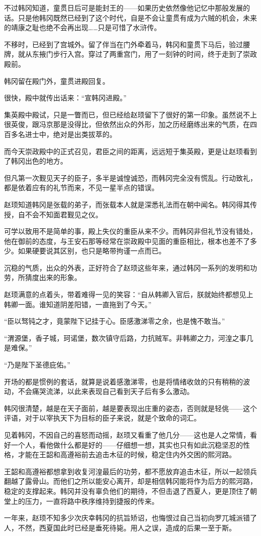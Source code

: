 不过韩冈知道，童贯日后可是能封王的——如果历史依然像他记忆中那般发展的话。只是他韩冈既然已经到了这个时代，自是不会让童贯有成为六贼的机会，未来的靖康之耻也绝不会再出现……只是可惜了水浒传。

不移时，已经到了宫城外。留了伴当在门外牵着马，韩冈和童贯下马后，验过腰牌，就从东掖门步行入宫。穿过了两重宫门，用了一刻钟的时间，终于走到了崇政殿前。

韩冈留在殿门外，童贯进殿回复。

很快，殿中就传出话来：“宣韩冈进殿。”

集英殿中殿试，只是一瞥而已，但已经给赵顼留下了很好的第一印象。虽然说不上很英俊，跟冯京那是没得比，但依然出众的外形，加之历经磨练出来的气质，在四百多名进士中，绝对是出类拔萃的。

而今天崇政殿中的正式召见，君臣之间的距离，远远短于集英殿，更是让赵顼看到了韩冈出色的地方。

但凡第一次觐见天子的臣子，多半是诚惶诚恐，而韩冈完全没有慌乱。行动致礼，都是依着应有的礼节而来，不见一星半点的错误。

赵顼知道韩冈是张载的弟子，而张载本人就是深悉礼法而在朝中闻名。韩冈得其传授，自不会不知面君觐见之仪。

可学以致用不是简单的事，殿上失仪的重臣从来不少。而韩冈非但礼节没有错处，他在御前的态度，与王安石那等经常在崇政殿中见面的重臣相比，根本也差不了多少。如果硬要说其区别，也只是略带拘谨一点而已。

沉稳的气质，出众的外表，正好符合了赵顼这些年来，通过韩冈一系列的发明和功劳，所猜度出来的形象。

赵顼满意的点着头，带着难得一见的笑容：“自从韩卿入官后，朕就始终都想见上韩卿一面。谁知道阴差阳错，一直拖到了今天。”

“臣以驽钝之才，竟蒙陛下记挂于心。臣感激涕零之余，也是愧不敢当。”

“渭源堡，香子城，珂诺堡，数次镇守后路，力抗贼军。非韩卿之力，河湟之事几是难保。”

“乃是陛下圣德庇佑。”

开场的都是惯例的套话，就算是说着感激涕零，也是将情绪收敛的只有稍稍的波动，不会痛哭流涕，以此来表现自己看到天子后有多么激动。

韩冈很清楚，越是在天子面前，越是要表现出庄重的姿态，否则就是轻佻——这个评语，对于以宰执天下为目标的臣子来说，就是个致命的词汇。

见着韩冈，不因自己的喜怒而动摇，赵顼又看重了他几分——这也是人之常情，看好一个人，看他做什么都是好的——仔细想一想，其实也只有如此沉稳坚忍的性格，才能在王韶和高遵裕前去追击木征的时候，稳定住内外交困的熙河路。

王韶和高遵裕都想拿到收复河湟最后的功劳，都不愿放弃追击木征，所以一起领兵翻越了露骨山。而他们之所以能安心离开，却是相信韩冈能将作为后方的熙河路，稳定的支撑起来。韩冈并没有辜负他们的期待，不但击退了西夏人，更是顶住了朝堂上的压力，一直将路中秩序维持到捷报的传来。

一年来，赵顼不知多少次庆幸韩冈的抗旨矫诏，也悔恨过自己当初向罗兀城派错了人，不然，西夏国此时已经是垂死待毙。用人之误，造成的后果一至于斯。

